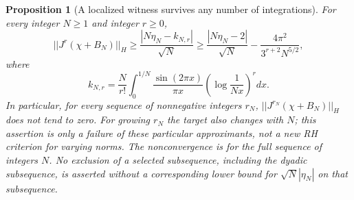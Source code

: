 \documentclass[11pt]{article}
\def\norm#1{||#1||}%
\newtheorem{proposition}[theorem]{Proposition}
\theoremstyle{remark}
\newcommand{\norm}[1]{\left\lVert #1\right\rVert}
\begin{document}
\begin{proposition}[A localized witness survives any number of integrations]
\label{prop:ns62-smoothed-obstruction}
For every integer $N\geq1$ and integer $r\geq0$,
\begin{equation}
 \norm{J^r(\chi+B_N)}_H
 \geq\frac{|N\eta_N-k_{N,r}|}{\sqrt N}
 \geq\frac{|N\eta_N-2|}{\sqrt N}
            -\frac{4\pi^2}{3^{r+2}N^{5/2}},
 \label{eq:ns62-laguerre-lower}
\end{equation}
where
\[
 k_{N,r}=\frac N{r!}\int_0^{1/N}
       \frac{\sin(2\pi x)}{\pi x}
                    \left(\log\frac1{Nx}\right)^r dx.
\]
In particular, for every sequence of nonnegative integers $r_N$,
$\norm{J^{r_N}(\chi+B_N)}_H$ does not tend to zero.
For growing $r_N$ the target also changes with $N$; this assertion
is only a failure of these particular approximants, not a new RH
criterion for varying norms.
The nonconvergence is for the full sequence of integers $N$. No
exclusion of a selected subsequence, including the dyadic subsequence,
is asserted without a corresponding lower bound for $\sqrt N|\eta_N|$
on that subsequence.
\end{proposition}
\end{document}
